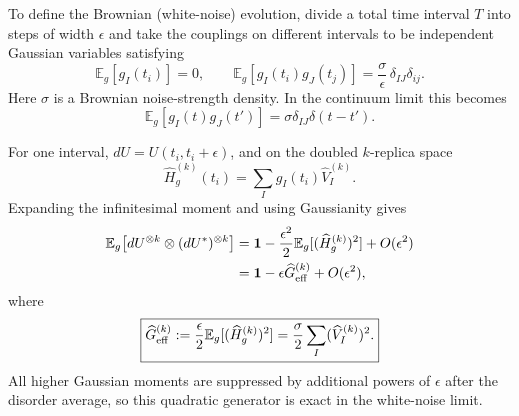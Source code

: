 \documentclass{article}
\theoremstyle{definition}
\begin{document}
To define the Brownian (white-noise) evolution, divide a total time interval $T$ into
steps of width $\epsilon$ and take the couplings on different intervals to
be independent Gaussian variables satisfying
\begin{equation}
    \mathbb E_g[g_I(t_i)]=0,
    \qquad
    \mathbb E_g[g_I(t_i)g_J(t_j)]
    =\frac{\sigma}{\epsilon}\,
     \delta_{IJ}\delta_{ij}.
\end{equation}
Here $\sigma$ is a Brownian noise-strength density.  In the continuum limit
this becomes
\begin{equation}
    \mathbb E_g[g_I(t)g_J(t')]
    =\sigma\delta_{IJ}\delta(t-t').
\end{equation}

For one interval,
$dU=U(t_i,t_i+\epsilon)$, and on the doubled $k$-replica space
\begin{equation}
    \widehat H_g^{(k)}(t_i)
    =\sum_Ig_I(t_i)\widehat V_I^{(k)}.
\end{equation}
Expanding the infinitesimal moment and using Gaussianity gives
\begin{align}
    \mathbb E_g\!\left[dU^{\otimes k}\otimes(dU^*)^{\otimes k}\right]
    &={\bf 1}
      -\frac{\epsilon^2}{2}
       \mathbb E_g[(\widehat H_g^{(k)})^2]
      +O(\epsilon^2)
    \nonumber\\
    &={\bf 1}-\epsilon\widehat G_{\rm eff}^{(k)}+O(\epsilon^2),
\end{align}
where
\begin{equation}
    \boxed{
    \widehat G_{\rm eff}^{(k)}
    :=\frac{\epsilon}{2}
      \mathbb E_g[(\widehat H_g^{(k)})^2]
    =\frac{\sigma}{2}\sum_I(\widehat V_I^{(k)})^2.
    }
    \label{eq:brownian_general_Ghat}
\end{equation}
All higher Gaussian moments are suppressed by additional powers of
$\epsilon$ after the disorder average, so this quadratic generator is exact
in the white-noise limit.
\end{document}
